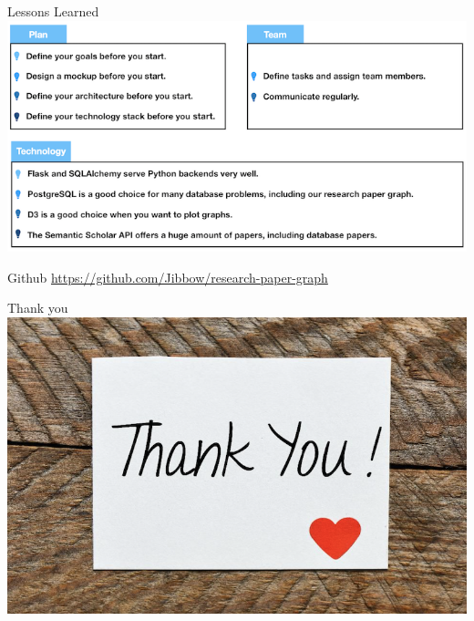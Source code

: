 \documentclass{beamer}
\begin{document}
\begin{frame}{Lessons Learned}
    \includegraphics{img_21.png}
\end{frame}

\begin{frame}{Github}
    \url{https://github.com/Jibbow/research-paper-graph}
\end{frame}

\begin{frame}{Thank you}
    \includegraphics{img_05.png}
\end{frame}
\end{document}
